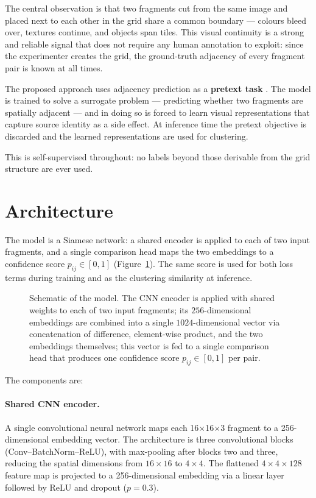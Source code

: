\documentclass[12pt, a4paper]{article}
\begin{document}
The central observation is that two fragments cut from the same image and placed next to
each other in the grid share a common boundary — colours bleed over, textures continue,
and objects span tiles. This visual continuity is a strong and reliable signal that does
not require any human annotation to exploit: since the experimenter creates the grid, the
ground-truth adjacency of every fragment pair is known at all times.

The proposed approach uses adjacency prediction as a \textbf{pretext task}
\parencite{noroozi2016}. The model is trained to solve a surrogate problem — predicting
whether two fragments are spatially adjacent — and in doing so is forced to learn visual
representations that capture source identity as a side effect. At inference time the
pretext objective is discarded and the learned representations are used for clustering.

This is self-supervised throughout: no labels beyond those derivable from the grid
structure are ever used.

\section{Architecture}

The model is a Siamese network: a shared encoder is applied to each of two input
fragments, and a single comparison head maps the two embeddings to a confidence
score $p_{ij} \in [0, 1]$ (Figure~\ref{fig:architecture}). The same score is
used for both loss terms during training and as the clustering similarity at
inference.

\begin{figure}[h]
\centering

\caption{Schematic of the model. The CNN encoder is applied with shared weights
to each of two input fragments; its $256$-dimensional embeddings are combined into a
single $1024$-dimensional vector via concatenation of difference, element-wise
product, and the two embeddings themselves; this vector is fed to a single
comparison head that produces one confidence score $p_{ij} \in [0, 1]$ per pair.}
\label{fig:architecture}
\end{figure}

The components are:

\paragraph{Shared CNN encoder.}
A single convolutional neural network maps each 16$\times$16$\times$3 fragment to a
256-dimensional embedding vector. The architecture is three convolutional blocks
(Conv--BatchNorm--ReLU), with max-pooling after blocks two and three, reducing the
spatial dimensions from $16\times16$ to $4\times4$. The flattened $4\times4\times128$
feature map is projected to a 256-dimensional embedding via a linear layer followed by
ReLU and dropout ($p=0.3$).
\end{document}
